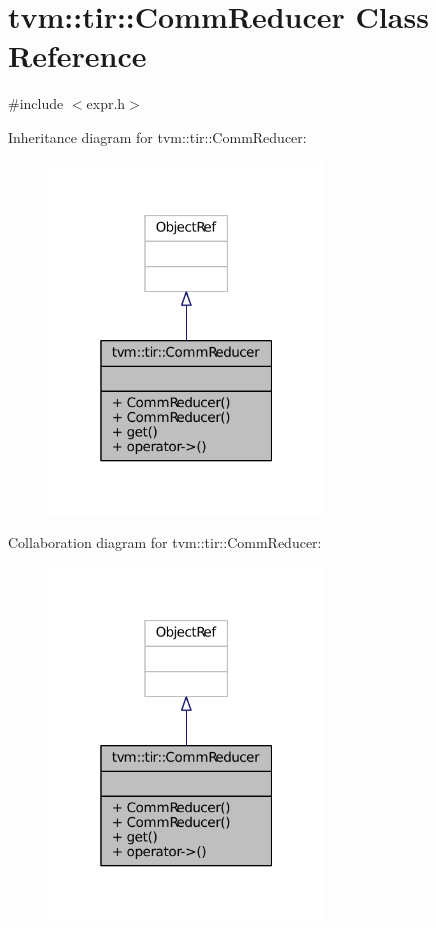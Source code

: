 \hypertarget{classtvm_1_1tir_1_1CommReducer}{}\section{tvm\+:\+:tir\+:\+:Comm\+Reducer Class Reference}
\label{classtvm_1_1tir_1_1CommReducer}


{\ttfamily \#include $<$expr.\+h$>$}



Inheritance diagram for tvm\+:\+:tir\+:\+:Comm\+Reducer\+:
\nopagebreak
\begin{figure}[H]
\begin{center}
\leavevmode
\includegraphics[width=208pt]{classtvm_1_1tir_1_1CommReducer__inherit__graph}
\end{center}
\end{figure}


Collaboration diagram for tvm\+:\+:tir\+:\+:Comm\+Reducer\+:
\nopagebreak
\begin{figure}[H]
\begin{center}
\leavevmode
\includegraphics[width=208pt]{classtvm_1_1tir_1_1CommReducer__coll__graph}
\end{center}
\end{figure}
